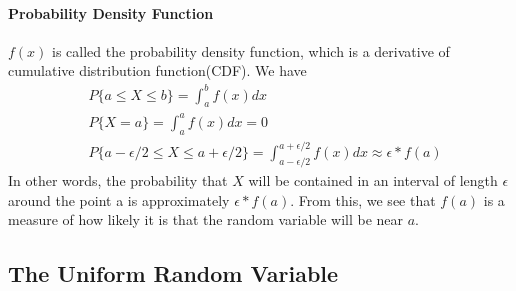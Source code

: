 \documentclass[10 pt,final]{article}
\newcommand{\impo}[1]{{\color{magenta} #1}}
\begin{document}
\paragraph{Probability Density Function} $f(x)$ is called the probability density function, which is a derivative of cumulative distribution function(CDF). We have
\begin{align*}
& P\{a \leq X \leq b\} = \int_{a}^{b} f(x)dx \\
& P\{X=a\} = \int_a^a f(x)dx = 0 \\
& P\{a -\epsilon/2 \leq X \leq a+\epsilon/2\} = \int_{a-\epsilon/2}^{a+\epsilon/2} f(x)dx \approx \epsilon*f(a)
\end{align*}
In other words, the probability that \impo{$X$ will be contained in an interval of length $\epsilon$} around the point a is approximately $\epsilon *f(a)$. From this, we see that \impo{ $f(a)$ is a measure of how likely it is that the random variable will be near $a$}.


\subsection{The Uniform Random Variable}

\end{document}
